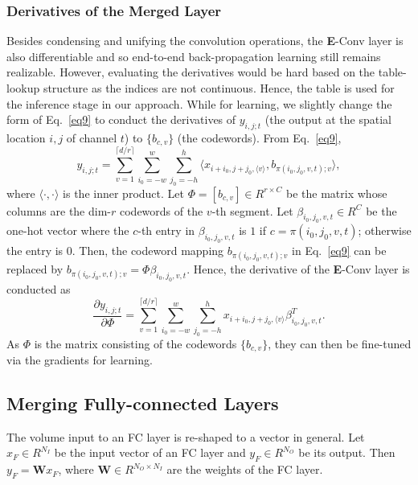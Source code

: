 \documentclass{article}
\begin{document}
	
	
	
	\subsubsection{Derivatives of the Merged Layer}
	Besides condensing and unifying the convolution operations, the \textbf{E}-Conv layer is also differentiable and so end-to-end back-propagation learning still remains realizable.
	However, evaluating the derivatives would be hard based on the table-lookup structure as the indices are not continuous.
	Hence, the table is used for the inference stage in our approach.
	While for learning, we slightly change the form of Eq.~\ref{eq9} to conduct the derivatives of $y_{i,j;t}$ (the output at the spatial location $i,j$ of channel $t$) to $\{b_{c,v}\}$ (the codewords).
	From Eq.~\ref{eq9}, %
	\begin{equation}
	\label{eq11}
	y_{i,j;t} =\sum_{v=1}^{\lceil d/r \rceil}\sum_{i_0=-w}^{w}\sum_{j_0=-h}^{h} \langle x_{i+i_0,j+j_0,\langle v \rangle}, b_{\pi(i_0,j_0,v,t);v} \rangle,
	\end{equation}
	where $\langle\cdot,\cdot\rangle$ is the inner product.
	Let $\Phi=[b_{c,v}]\in R^{r\times C}$ be the matrix whose columns are the dim-$r$ codewords of the $v$-th segment.
	Let $\beta_{i_0,j_0,v,t}\in R^C$ be the one-hot vector where the $c$-th entry in $\beta_{i_0,j_0,v,t}$ is $1$ if $c=\pi(i_0,j_0,v,t)$; otherwise the entry is $0$.
	Then, the codeword mapping $b_{\pi(i_0,j_0,v,t);v}$ in Eq.~\ref{eq9} can be replaced by $b_{\pi(i_0,j_0,v,t);v}=\Phi\beta_{i_0,j_0,v,t}$.
	Hence, the derivative of the \textbf{E}-Conv layer is conducted as
	\begin{equation}
	\label{eq12}
	\frac{\partial y_{i,j;t}}{\partial \Phi} = \sum_{v=1}^{\lceil d/r \rceil}\sum_{i_0=-w}^{w}\sum_{j_0=-h}^{h} x_{i+i_0,j+j_0,\langle v \rangle}\beta_{i_0,j_0,v,t}^T.
	\end{equation}
	As $\Phi$ is the matrix consisting of the codewords $\{b_{c,v}\}$, they can then be fine-tuned via the gradients for learning. %
	
	
	
	
	
	
	
	
	
	
	
	
	
	\subsection{Merging Fully-connected Layers}
	The volume input to an FC layer is re-shaped to a vector in general.
	Let $x_F \in R^{N_I}$ be the input vector of an FC layer and $y_F \in R^{N_O}$ be its output.
	Then $y_F=\mathbf{W}x_F$, where $\mathbf{W} \in R^{N_O\times N_I}$ are the weights of the FC layer.
	
\end{document}
